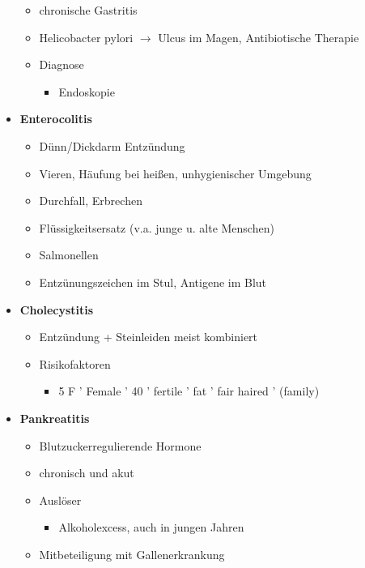 \begin{itemize}
\begin{itemize}
\begin{itemize}
						\end{itemize}
					\item chronische Gastritis
					\item Helicobacter pylori $\rightarrow$ Ulcus im Magen, Antibiotische Therapie
					\item Diagnose
						\begin{itemize}
							\item Endoskopie
						\end{itemize}
				\end{itemize}
			\item \textbf{Enterocolitis}
				\begin{itemize}
					\item Dünn/Dickdarm Entzündung
					\item Vieren, Häufung bei heißen, unhygienischer Umgebung
					\item Durchfall, Erbrechen
					\item Flüssigkeitsersatz (v.a. junge u. alte Menschen)
					\item Salmonellen
					\item Entzünungszeichen im Stul, Antigene im Blut
				\end{itemize}
			\item \textbf{Cholecystitis}
				\begin{itemize}
					\item Entzündung + Steinleiden meist kombiniert
					\item Risikofaktoren
						\begin{itemize}
							\item 5 F
									' Female
									' 40
									' fertile
									' fat
									' fair haired
									' (family)
						\end{itemize}
				\end{itemize}
	\pagebreak
			\item \textbf{Pankreatitis}
				\begin{itemize}
					\item Blutzuckerregulierende Hormone
					\item chronisch und akut
					\item Auslöser
						\begin{itemize}
							\item Alkoholexcess, auch in jungen Jahren
						\end{itemize}
					\item Mitbeteiligung mit Gallenerkrankung
				\end{itemize}

\end{itemize}
